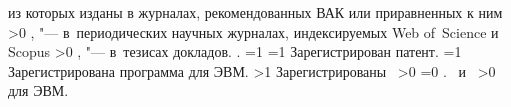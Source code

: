 {\begin{refsection}
         из которых изданы в журналах, рекомендованных ВАК или приравненных к ним\sloppy%
        \ifnum \value{citeauthorscopuswos}>0%
            ,  "--- в~периодических научных журналах, индексируемых Web of~Science и Scopus\sloppy%
        \fi%
        \ifnum \value{citeauthorconf}>0%
            ,  "--- в~тезисах докладов.
        \else%
            .
        \fi%
        \ifnum \value{citeregistered}=1%
            \ifnum \value{citeauthorpatent}=1%
                Зарегистрирован  патент.
            \fi%
            \ifnum \value{citeauthorprogram}=1%
                Зарегистрирована  программа для ЭВМ.
            \fi%
        \fi%
        \ifnum \value{citeregistered}>1%
            Зарегистрированы\ %
            \ifnum \value{citeauthorpatent}>0%
            \sloppy%
            \ifnum \value{citeauthorprogram}=0 . \else \ и~\fi%
            \fi%
            \ifnum \value{citeauthorprogram}>0%
             для ЭВМ.
            \fi%
        \fi%
    \end{refsection}%
    \begin{refsection}
        \nocite{tyu:daor}%
        \nocite{tyu:jphys}%
        \nocite{tyu:motor}%
        \nocite{tyu:msim22}%
        \nocite{tyu:opta}%
        \nocite{tyu:reis}%
        \nocite{tyu22:ring}%
        \nocite{tyu:fmh}%
    \end{refsection}%
}
